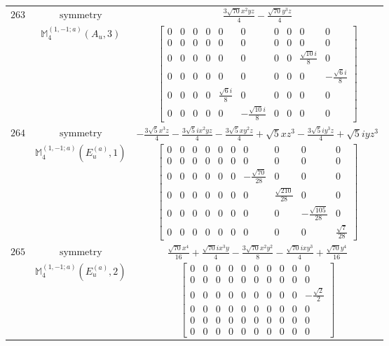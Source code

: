 \documentclass[fleqn,8pt,landscape]{jsarticle}
\begin{document}
\begin{longtable}{ccc}
$ 263 $ & $ \text{symmetry} $ & $ \frac{3 \sqrt{70} x^{2} y z}{4} - \frac{\sqrt{70} y^{3} z}{4} $ \\
$  $ & $ \mathbb{M}_{4}^{(1,-1;a)}(A_{u},3) $ & $ \begin{bmatrix} 0 & 0 & 0 & 0 & 0 & 0 & 0 & 0 & 0 & 0 \\ 0 & 0 & 0 & 0 & 0 & 0 & 0 & 0 & 0 & 0 \\ 0 & 0 & 0 & 0 & 0 & 0 & 0 & 0 & \frac{\sqrt{10} i}{8} & 0 \\ 0 & 0 & 0 & 0 & 0 & 0 & 0 & 0 & 0 & - \frac{\sqrt{6} i}{8} \\ 0 & 0 & 0 & 0 & \frac{\sqrt{6} i}{8} & 0 & 0 & 0 & 0 & 0 \\ 0 & 0 & 0 & 0 & 0 & - \frac{\sqrt{10} i}{8} & 0 & 0 & 0 & 0 \end{bmatrix} $ \\ \hline
$ 264 $ & $ \text{symmetry} $ & $ - \frac{3 \sqrt{5} x^{3} z}{4} - \frac{3 \sqrt{5} i x^{2} y z}{4} - \frac{3 \sqrt{5} x y^{2} z}{4} + \sqrt{5} x z^{3} - \frac{3 \sqrt{5} i y^{3} z}{4} + \sqrt{5} i y z^{3} $ \\
$  $ & $ \mathbb{M}_{4}^{(1,-1;a)}(E_{u}^{(a)},1) $ & $ \begin{bmatrix} 0 & 0 & 0 & 0 & 0 & 0 & 0 & 0 & 0 & 0 \\ 0 & 0 & 0 & 0 & 0 & 0 & 0 & 0 & 0 & 0 \\ 0 & 0 & 0 & 0 & 0 & 0 & - \frac{\sqrt{70}}{28} & 0 & 0 & 0 \\ 0 & 0 & 0 & 0 & 0 & 0 & 0 & \frac{\sqrt{210}}{28} & 0 & 0 \\ 0 & 0 & 0 & 0 & 0 & 0 & 0 & 0 & - \frac{\sqrt{105}}{28} & 0 \\ 0 & 0 & 0 & 0 & 0 & 0 & 0 & 0 & 0 & \frac{\sqrt{7}}{28} \end{bmatrix} $ \\ \hline
$ 265 $ & $ \text{symmetry} $ & $ \frac{\sqrt{70} x^{4}}{16} + \frac{\sqrt{70} i x^{3} y}{4} - \frac{3 \sqrt{70} x^{2} y^{2}}{8} - \frac{\sqrt{70} i x y^{3}}{4} + \frac{\sqrt{70} y^{4}}{16} $ \\
$  $ & $ \mathbb{M}_{4}^{(1,-1;a)}(E_{u}^{(a)},2) $ & $ \begin{bmatrix} 0 & 0 & 0 & 0 & 0 & 0 & 0 & 0 & 0 & 0 \\ 0 & 0 & 0 & 0 & 0 & 0 & 0 & 0 & 0 & 0 \\ 0 & 0 & 0 & 0 & 0 & 0 & 0 & 0 & 0 & - \frac{\sqrt{2}}{2} \\ 0 & 0 & 0 & 0 & 0 & 0 & 0 & 0 & 0 & 0 \\ 0 & 0 & 0 & 0 & 0 & 0 & 0 & 0 & 0 & 0 \\ 0 & 0 & 0 & 0 & 0 & 0 & 0 & 0 & 0 & 0 \end{bmatrix} $ \\ \hline

\end{longtable}
\end{document}
